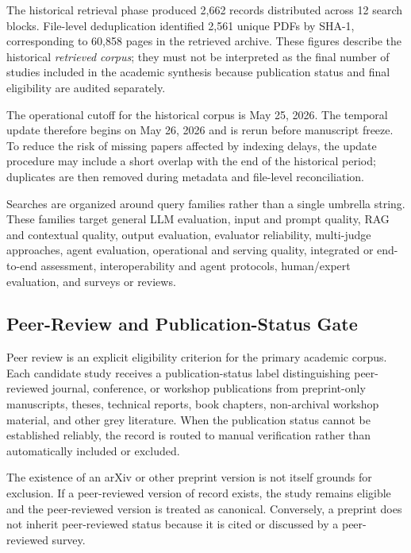 The historical retrieval phase produced 2,662 records distributed across 12 search blocks. File-level deduplication identified 2,561 unique PDFs by SHA-1, corresponding to 60,858 pages in the retrieved archive. These figures describe the historical \emph{retrieved corpus}; they must not be interpreted as the final number of studies included in the academic synthesis because publication status and final eligibility are audited separately.

The operational cutoff for the historical corpus is May 25, 2026. The temporal update therefore begins on May 26, 2026 and is rerun before manuscript freeze. To reduce the risk of missing papers affected by indexing delays, the update procedure may include a short overlap with the end of the historical period; duplicates are then removed during metadata and file-level reconciliation.

Searches are organized around query families rather than a single umbrella string. These families target general LLM evaluation, input and prompt quality, RAG and contextual quality, output evaluation, evaluator reliability, multi-judge approaches, agent evaluation, operational and serving quality, integrated or end-to-end assessment, interoperability and agent protocols, human/expert evaluation, and surveys or reviews.


\subsection{Peer-Review and Publication-Status Gate}

Peer review is an explicit eligibility criterion for the primary academic corpus. Each candidate study receives a publication-status label distinguishing peer-reviewed journal, conference, or workshop publications from preprint-only manuscripts, theses, technical reports, book chapters, non-archival workshop material, and other grey literature. When the publication status cannot be established reliably, the record is routed to manual verification rather than automatically included or excluded.

The existence of an arXiv or other preprint version is not itself grounds for exclusion. If a peer-reviewed version of record exists, the study remains eligible and the peer-reviewed version is treated as canonical. Conversely, a preprint does not inherit peer-reviewed status because it is cited or discussed by a peer-reviewed survey.

